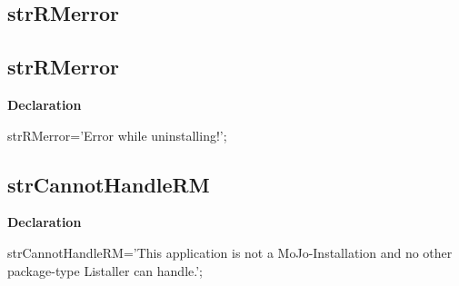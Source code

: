\documentclass{report}
\newif\ifpdf
\begin{document}
\subsection*{\large{\textbf{strRMerror}}\normalsize\hspace{1ex}\hrulefill}
\else
\subsection*{strRMerror}
\fi
\label{trstrings-strRMerror}
\begin{list}{}{
\setlength{\itemindent}{0cm}
\setlength{\listparindent}{0cm}
\setlength{\leftmargin}{\evensidemargin}
\addtolength{\leftmargin}{\tmplength}
\settowidth{\labelsep}{X}
\addtolength{\leftmargin}{\labelsep}
\setlength{\labelwidth}{\tmplength}
}
\item[\textbf{Declaration}\hfill]
\ifpdf
\begin{flushleft}
\fi
\begin{ttfamily}
strRMerror='Error while uninstalling!';\end{ttfamily}

\ifpdf
\end{flushleft}
\fi

\end{list}
\ifpdf
\subsection*{\large{\textbf{strCannotHandleRM}}\normalsize\hspace{1ex}\hrulefill}
\else
\subsection*{strCannotHandleRM}
\fi
\label{trstrings-strCannotHandleRM}
\begin{list}{}{
\setlength{\itemindent}{0cm}
\setlength{\listparindent}{0cm}
\setlength{\leftmargin}{\evensidemargin}
\addtolength{\leftmargin}{\tmplength}
\settowidth{\labelsep}{X}
\addtolength{\leftmargin}{\labelsep}
\setlength{\labelwidth}{\tmplength}
}
\item[\textbf{Declaration}\hfill]
\ifpdf
\begin{flushleft}
\fi
\begin{ttfamily}
strCannotHandleRM='This application is not a MoJo-Installation and no other package-type Listaller can handle.';\end{ttfamily}

\ifpdf
\end{flushleft}
\fi

\end{list}
\ifpdf
\end{document}
